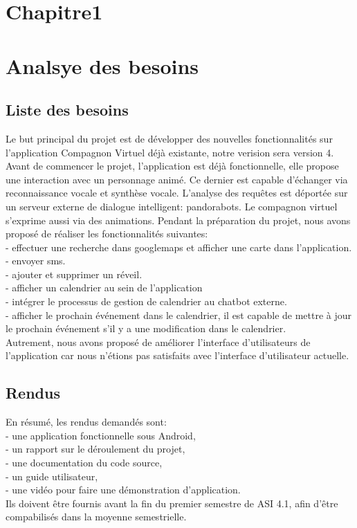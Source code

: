 \section*{Chapitre1}
\section{Analsye des besoins}
\subsection{Liste des besoins}
Le but principal du projet est de développer des nouvelles fonctionnalités sur l'application Compagnon Virtuel déjà existante, notre verision sera version 4.
Avant de commencer le projet, l'application est déjà fonctionnelle, elle propose une interaction avec un personnage animé. Ce dernier est capable d'échanger via reconnaissance vocale et synthèse vocale. L'analyse des requêtes est déportée sur un serveur externe de dialogue intelligent: pandorabots. Le compagnon virtuel s'exprime aussi via des animations. Pendant la préparation du projet, nous avons proposé de réaliser les fonctionnalités suivantes:\\
	\indent- effectuer une recherche dans googlemaps et afficher une carte dans l'application.\\
	\indent- envoyer sms.\\
	\indent- ajouter et supprimer un réveil.\\
	\indent- afficher un calendrier au sein de l'application\\
	\indent- intégrer le processus de gestion de calendrier au chatbot externe.\\
	\indent- afficher le prochain événement dans le calendrier, il est capable de mettre à jour le prochain événement s'il y a une modification dans le calendrier.\\
	
Autrement, nous avons proposé de améliorer l'interface d'utilisateurs de l'application car nous n'étions pas satisfaits avec l'interface d'utilisateur actuelle.

\subsection{Rendus}
En résumé, les rendus demandés sont:\\
    \indent- une application fonctionnelle sous Android,\\
    \indent- un rapport sur le déroulement du projet,\\
    \indent- une documentation du code source,\\
    \indent- un guide utilisateur,\\
	\indent- une vidéo pour faire une démonstration d'application.\\
\indent Ils doivent être fournis avant la fin du premier semestre de ASI 4.1, afin d'être compabilisés dans la moyenne semestrielle.
\newpage
